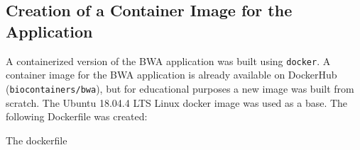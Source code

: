 \documentclass{article}
\begin{document}
\subsection{Creation of a Container Image for the Application}
A containerized version of the BWA application was built using \texttt{docker}.
A container image for the BWA application is already available on DockerHub (\texttt{biocontainers/bwa}), but for educational purposes a new image was built from scratch.
The Ubuntu 18.04.4 LTS Linux docker image was used as a base.
The following Dockerfile was created:

\begin{lstlistings}
The dockerfile
\end{lstlistings}
\end{document}
